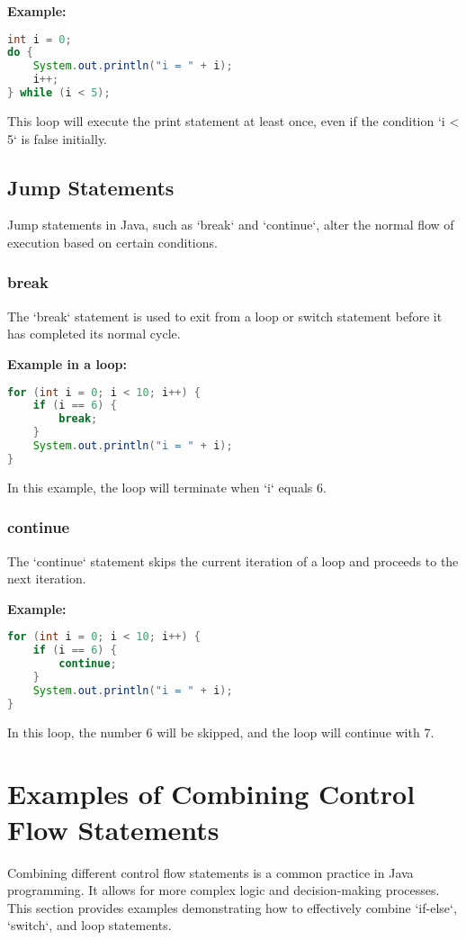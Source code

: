 \documentclass{article}
\begin{document}
\textbf{Example:}

\begin{lstlisting}[language=Java]
int i = 0;
do {
    System.out.println("i = " + i);
    i++;
} while (i < 5);
\end{lstlisting}

This loop will execute the print statement at least once, even if the condition `i < 5` is false initially.


\newpage\subsection{Jump Statements}
Jump statements in Java, such as `break` and `continue`, alter the normal flow of execution based on certain conditions.

\subsubsection{break}
The `break` statement is used to exit from a loop or switch statement before it has completed its normal cycle.

\textbf{Example in a loop:}

\begin{lstlisting}[language=Java]
for (int i = 0; i < 10; i++) {
    if (i == 6) {
        break;
    }
    System.out.println("i = " + i);
}
\end{lstlisting}

In this example, the loop will terminate when `i` equals 6.

\subsubsection{continue}
The `continue` statement skips the current iteration of a loop and proceeds to the next iteration.

\textbf{Example:}

\begin{lstlisting}[language=Java]
for (int i = 0; i < 10; i++) {
    if (i == 6) {
        continue;
    }
    System.out.println("i = " + i);
}
\end{lstlisting}

In this loop, the number 6 will be skipped, and the loop will continue with 7.


\newpage
\section{Examples of Combining Control Flow Statements}
Combining different control flow statements is a common practice in Java programming. It allows for more complex logic and decision-making processes. This section provides examples demonstrating how to effectively combine `if-else`, `switch`, and loop statements.
\end{document}
